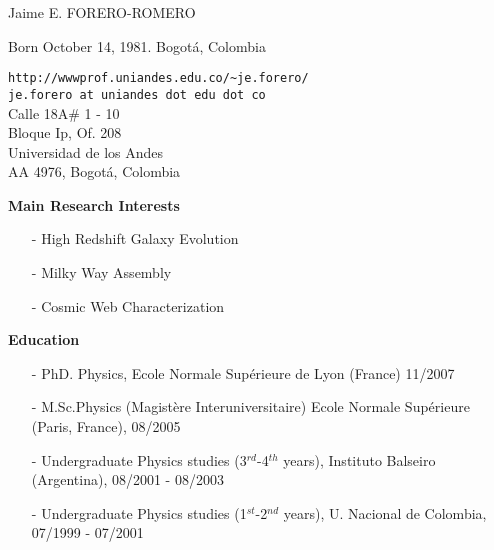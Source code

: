 \documentclass[9pt]{article}
\begin{document}
\noindent

\noindent
{{\Large Jaime E. FORERO-ROMERO}}\\
\begin{flushleft}
Born October 14, 1981. Bogot\'a, Colombia\\
\end{flushleft}
\begin{flushright}
\verb"http://wwwprof.uniandes.edu.co/~je.forero/" \\{\tt{je.forero at uniandes dot edu dot co}}\\
Calle 18A\# 1 - 10\\
Bloque Ip, Of. 208\\
Universidad de los Andes\\
AA 4976, Bogot\'a, Colombia\\
\end{flushright}


{\bf Main Research Interests}
\begin{itemize}
\item[-]{High Redshift Galaxy Evolution}
\item[-]{Milky Way Assembly}
\item[-]{Cosmic Web Characterization}
\end{itemize}

{\bf Education}
\indent
\begin{itemize}
\item[-] PhD. Physics, Ecole Normale Sup\'erieure de Lyon (France) 11/2007
\item[-] M.Sc.Physics (Magistère Interuniversitaire)  Ecole Normale
  Sup\'erieure (Paris, France), 08/2005
\item[-] Undergraduate Physics studies (3$^{rd}$-4$^{th}$ years),
  Instituto Balseiro (Argentina), 08/2001 - 08/2003
\item[-] Undergraduate Physics studies (1$^{st}$-2$^{nd}$ years),
  U. Nacional de Colombia, 07/1999 -  07/2001
\end{itemize}
\end{document}
